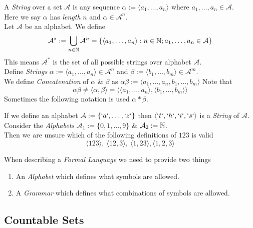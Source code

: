 \documentclass[11pt,a4paper]{article}
\begin{document}
A \textit{String} over a set $\mathcal{A}$ is any sequence $\alpha:=\langle a_1,\dots,a_n\rangle$ where $a_1,\dots,a_n\in\mathcal{A}$.\\
\nb Here we say $\alpha$ has \textit{length} $n$ and $\alpha\in\mathcal{A}^n$.\\

Let $\mathcal{A}$ be an alphabet. We define
$$\mathcal{A}^*:=\bigcup\limits_{n\in\mathbb{N}}\mathcal{A}^n=\{\langle a_1,\dots,a_n\rangle:n\in\mathbb{N};a_1,\dots,a_n\in\mathcal{A}\}$$
This means $\mathcal{A}^*$ is the set of all possible strings over alphabet $\mathcal{A}$.\\

Define \textit{Strings} $\alpha:=\langle a_1,\dots,a_n\rangle\in\mathcal{A}^n$ and $\beta:=\langle b_1,\dots,b_m\rangle\in\mathcal{A}^m$.\\
We define \textit{Concatenation} of $\alpha$ \& $\beta$ as
$\alpha\beta:=\langle a_1,\dots,a_n,b_1,\dots,b_m\rangle$
Note that
$$\alpha\beta\neq\langle\alpha,\beta\rangle=\langle\langle a_1,\dots,a_n\rangle,\langle b_1,\dots,b_m\rangle\rangle$$
\nb Sometimes the following notation is used $\alpha*\beta$.

If we define an alphabet $\mathcal{A}:=\{`a`,\dots,`z`\}$ then $\langle`t`,`h`,`i`,`s`\rangle$ is a \textit{String} of $\mathcal{A}$.\\

Consider the \textit{Alphabets} $\mathcal{A}_1:=\{0,1,\dots,9\}$ \& $\mathcal{A}_2:=\mathbb{N}$.\\
Then we are unsure which of the following definitions of $123$ is valid
$$\langle123\rangle,\ \langle12,3\rangle,\ \langle1,23\rangle, \langle1,2,3\rangle$$


When describing a \textit{Formal Language} we need to provide two things
\begin{enumerate}
	\item An \textit{Alphabet} which defines what symbols are allowed.
	\item A \textit{Grammar} which defines what combinations of symbols are allowed.
\end{enumerate}

\subsection{Countable Sets}
\end{document}
